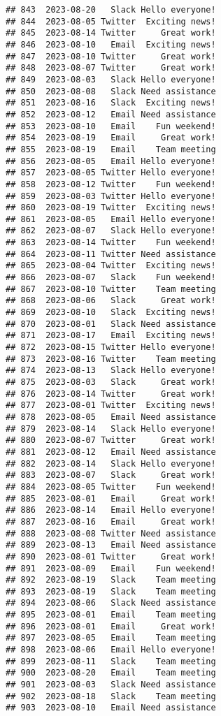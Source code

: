 \documentclass[
]{article}
\begin{document}
\begin{verbatim}
## 843  2023-08-20   Slack Hello everyone!
## 844  2023-08-05 Twitter  Exciting news!
## 845  2023-08-14 Twitter     Great work!
## 846  2023-08-10   Email  Exciting news!
## 847  2023-08-10 Twitter     Great work!
## 848  2023-08-07 Twitter     Great work!
## 849  2023-08-03   Slack Hello everyone!
## 850  2023-08-08   Slack Need assistance
## 851  2023-08-16   Slack  Exciting news!
## 852  2023-08-12   Email Need assistance
## 853  2023-08-10   Email    Fun weekend!
## 854  2023-08-19   Email     Great work!
## 855  2023-08-19   Email    Team meeting
## 856  2023-08-05   Email Hello everyone!
## 857  2023-08-05 Twitter Hello everyone!
## 858  2023-08-12 Twitter    Fun weekend!
## 859  2023-08-03 Twitter Hello everyone!
## 860  2023-08-19 Twitter  Exciting news!
## 861  2023-08-05   Email Hello everyone!
## 862  2023-08-07   Slack Hello everyone!
## 863  2023-08-14 Twitter    Fun weekend!
## 864  2023-08-11 Twitter Need assistance
## 865  2023-08-04 Twitter  Exciting news!
## 866  2023-08-07   Slack    Fun weekend!
## 867  2023-08-10 Twitter    Team meeting
## 868  2023-08-06   Slack     Great work!
## 869  2023-08-10   Slack  Exciting news!
## 870  2023-08-01   Slack Need assistance
## 871  2023-08-17   Email  Exciting news!
## 872  2023-08-15 Twitter Hello everyone!
## 873  2023-08-16 Twitter    Team meeting
## 874  2023-08-13   Slack Hello everyone!
## 875  2023-08-03   Slack     Great work!
## 876  2023-08-14 Twitter     Great work!
## 877  2023-08-01 Twitter  Exciting news!
## 878  2023-08-05   Email Need assistance
## 879  2023-08-14   Slack Hello everyone!
## 880  2023-08-07 Twitter     Great work!
## 881  2023-08-12   Email Need assistance
## 882  2023-08-14   Slack Hello everyone!
## 883  2023-08-07   Slack     Great work!
## 884  2023-08-05 Twitter    Fun weekend!
## 885  2023-08-01   Email     Great work!
## 886  2023-08-14   Email Hello everyone!
## 887  2023-08-16   Email     Great work!
## 888  2023-08-08 Twitter Need assistance
## 889  2023-08-13   Email Need assistance
## 890  2023-08-01 Twitter     Great work!
## 891  2023-08-09   Email    Fun weekend!
## 892  2023-08-19   Slack    Team meeting
## 893  2023-08-19   Slack    Team meeting
## 894  2023-08-06   Slack Need assistance
## 895  2023-08-01   Email    Team meeting
## 896  2023-08-01   Email     Great work!
## 897  2023-08-05   Email    Team meeting
## 898  2023-08-06   Email Hello everyone!
## 899  2023-08-11   Slack    Team meeting
## 900  2023-08-20   Email    Team meeting
## 901  2023-08-03   Slack Need assistance
## 902  2023-08-18   Slack    Team meeting
## 903  2023-08-10   Email Need assistance

\end{verbatim}
\end{document}
